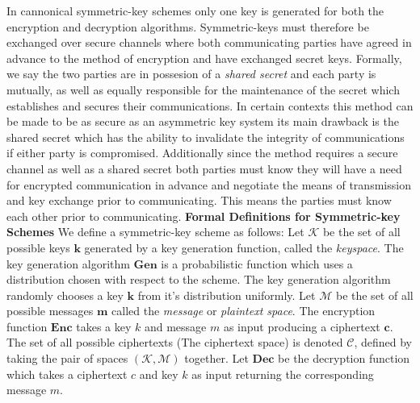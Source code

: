 In cannonical symmetric-key schemes only one key is generated for both the encryption and decryption algorithms. Symmetric-keys must therefore be exchanged over secure channels where both communicating parties have agreed in advance to the method of encryption and have exchanged secret keys. 
\newline
Formally, we say the two parties are in possesion of a \textit{shared secret} and each party is mutually, as well as equally responsible for the maintenance of the secret which establishes and secures their communications. 
In certain contexts this method can be made to be as secure as an asymmetric key system its main drawback is the shared secret which has the ability to invalidate the integrity of communications if either party is compromised.
\newline
Additionally since the method requires a secure channel as well as a shared secret both parties must know they will have a need for encrypted communication in advance and negotiate the means of transmission and key exchange prior to communicating. This means the parties must know each other prior to communicating. 
\newline
\textbf{Formal Definitions for Symmetric-key Schemes}
\newline
We define a symmetric-key scheme as follows:
\newline
Let $\mathbf{\mathcal{K}}$ be the set of all possible keys $\mathbf{k}$  generated by a key generation function, called the \textit{keyspace}.
\newline
The key generation algorithm $\mathbf{Gen}$ is a probabilistic function which uses a distribution chosen with respect to the scheme.
\newline
The key generation algorithm randomly chooses a key $\mathbf{k}$ from it's distribution uniformly. 
\medskip
Let $\mathbf{\mathcal{M}}$ be the set of all possible messages $\mathbf{m}$ called the \textit{message} or \textit{{plaintext space}}.
\newline
The encryption function $\mathbf{{Enc}}$ takes a key $k$ and message $m$ as input producing a ciphertext $\mathbf{c}$.
\newline
The set of all possible ciphertexts (The ciphertext space) is denoted $\mathbf{\mathcal{C}}$, defined by taking the pair of spaces $\mathbf{(\mathcal{K}, \mathcal{M})}$ together. 
\newline
Let $\mathbf{Dec}$ be the decryption function which takes a ciphertext $c$ and key $k$ as input returning the corresponding message $m$.
\bigskip

